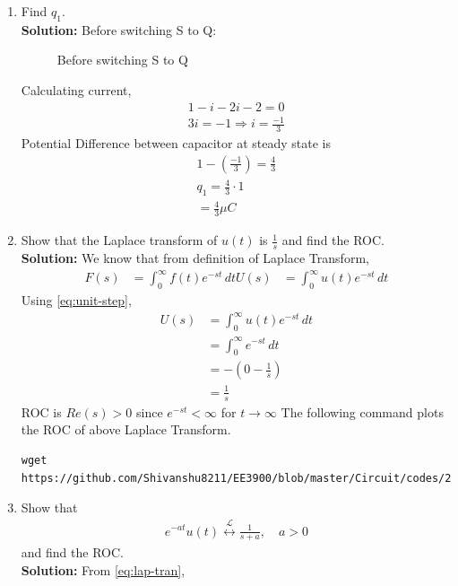 \documentclass[journal,12pt,twocolumn]{IEEEtran}
\newcommand{\solution}{\noindent \textbf{Solution: }}
\providecommand{\brak}[1]{\ensuremath{\left(#1\right)}}
\providecommand{\system}[1]{\overset{\mathcal{#1}}{ \longleftrightarrow}}
\numberwithin{equation}{section}
\renewcommand\thesection{\arabic{section}}
\begin{document}
\begin{enumerate}[label=\arabic*.,ref=\thesection.\theenumi]
\item Find $q_1$.\\
\solution
Before switching S to Q:
\begin{figure}
  
\caption{Before switching S to Q}
\end{figure}
Calculating current,
\begin{align}
1-i-2i-2=0\\
3i=-1 \Rightarrow i=\frac{-1}{3}
\end{align}
Potential Difference between capacitor at steady state is
\begin{align}
1-\brak{\frac{-1}{3}}=\frac{4}{3}\\
q_1=\frac{4}{3} \cdot 1\\
=\frac{4}{3} \mu C
\end{align}
	\item Show that the Laplace transform of $u(t)$ is $\frac{1}{s}$ and find the ROC.\\
	\solution We know that from definition of Laplace Transform,
	\begin{align}
	\label{eq:lap-tran}
	F(s)&= \int_{0}^{\infty} f(t)e^{-st} \,dt 
	U(s)&=\int_{0}^{\infty} u(t)e^{-st} \,dt
	\end{align}
	Using \eqref{eq:unit-step},
	\begin{align}
	U(s)&=\int_{0}^{\infty} u(t)e^{-st} \,dt\\
	&=\int_{0}^{\infty} e^{-st} \,dt\\
	&=-\brak{0-\frac{1}{s}}\\
	&=\frac{1}{s}
	\end{align}
	ROC is $ Re(s)>0$ since $e^{-st}<\infty$ for $t \to \infty$
	The following command plots the ROC of above Laplace Transform.
	\begin{lstlisting}
wget https://github.com/Shivanshu8211/EE3900/blob/master/Circuit/codes/2.4.py	
\end{lstlisting}
	\item Show that 
		\begin{align}
			e^{-at}u(t) \system{L} \frac{1}{s+a}, \quad a > 0
		\end{align}
		and find the ROC.\\
		\solution From \eqref{eq:lap-tran},
		\begin{align}

\end{align}
\end{enumerate}
\end{document}

